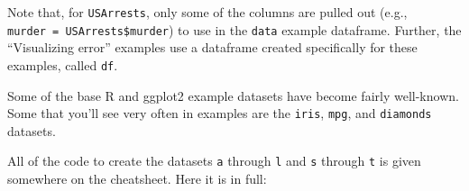 \documentclass[]{book}
\makeatletter
\newenvironment{kframe}{%
\medskip{}
\setlength{\fboxsep}{.8em}
 \def\at@end@of@kframe{}%
 \ifinner\ifhmode%
  \def\at@end@of@kframe{\end{minipage}}%
  \begin{minipage}{\columnwidth}%
 \fi\fi%
 \def\FrameCommand##1{\hskip\@totalleftmargin \hskip-\fboxsep
 \colorbox{shadecolor}{##1}\hskip-\fboxsep
     \hskip-\linewidth \hskip-\@totalleftmargin \hskip\columnwidth}%
 \MakeFramed {\advance\hsize-\width
   \@totalleftmargin\z@ \linewidth\hsize
   \@setminipage}}%
 {\par\unskip\endMakeFramed%
 \at@end@of@kframe}
\newenvironment{rmdblock}[1]
  {
  \begin{itemize}
  \renewcommand{\labelitemi}{
    \raisebox{-.7\height}[0pt][0pt]{
      {\setkeys{Gin}{width=3em,keepaspectratio}\texttt{[image: images/\#1]}}
    }
  }
  \setlength{\fboxsep}{1em}
  \begin{kframe}
  \item
  }
  {
  \end{kframe}
  \end{itemize}
  }
\newenvironment{rmdnote}
  {\begin{rmdblock}{note}}
  {\end{rmdblock}}
\theoremstyle{definition}
\theoremstyle{definition}
\theoremstyle{definition}
\theoremstyle{remark}
\makeatother
\begin{document}
Note that, for \texttt{USArrests}, only some of the columns are pulled
out (e.g., \texttt{murder\ =\ USArrests\$murder}) to use in the
\texttt{data} example dataframe. Further, the ``Visualizing error''
examples use a dataframe created specifically for these examples, called
\texttt{df}.

\begin{rmdnote}
Some of the base R and ggplot2 example datasets have become fairly
well-known. Some that you'll see very often in examples are the
\texttt{iris}, \texttt{mpg}, and \texttt{diamonds} datasets.
\end{rmdnote}

All of the code to create the datasets \texttt{a} through \texttt{l} and
\texttt{s} through \texttt{t} is given somewhere on the cheatsheet. Here
it is in full:
\end{document}
